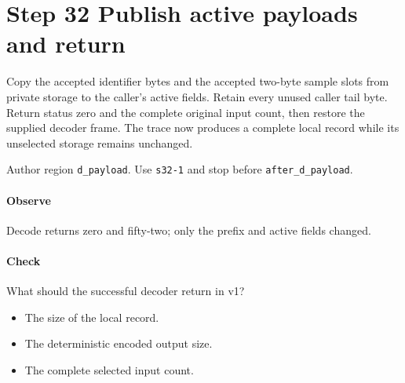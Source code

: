 \section{Step 32 Publish active payloads and return}\label{cbor-s32}
Copy the accepted identifier bytes and the accepted two-byte sample slots from private storage to the caller's active fields. Retain every unused caller tail byte. Return status zero and the complete original input count, then restore the supplied decoder frame. The trace now produces a complete local record while its unselected storage remains unchanged.

Author region \texttt{d\_payload}. Use \texttt{s32-1} and stop before \texttt{after\_d\_payload}.

\paragraph{Observe} Decode returns zero and fifty-two; only the prefix and active fields changed.

\paragraph{Check} What should the successful decoder return in v1?
\begin{itemize}
  \item[A.] The size of the local record.
  \item[B.] The deterministic encoded output size.
  \item[C.] The complete selected input count.
\end{itemize}
